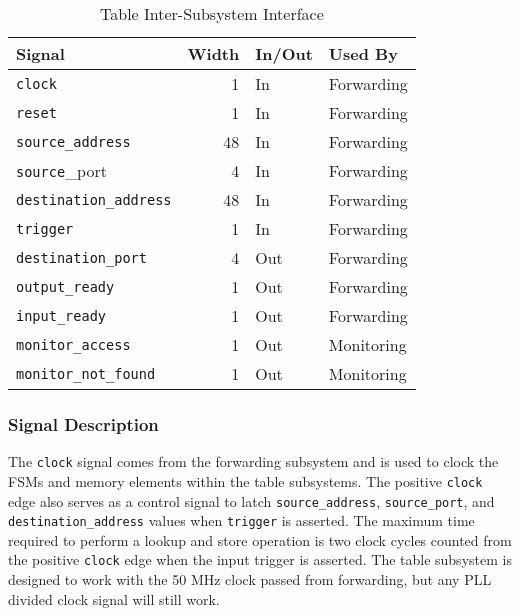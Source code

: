 \documentclass{article}
\begin{document}
\begin{table}[ht]
    \begin{center}
        \begin{tabular}{lrll}\hline
        Signal & Width & In/Out & Used By \\
        \hline
        \texttt{clock} & 1 & In & Forwarding \\
        \hline
        \texttt{reset} & 1 & In & Forwarding \\
        \hline
        \texttt{source\_address} & 48 & In & Forwarding \\
        \hline
        \texttt{source}\_port & 4 & In & Forwarding \\
        \hline
        \texttt{destination\_address} & 48 & In & Forwarding \\
        \hline
        \texttt{trigger} & 1 & In & Forwarding \\
        \hline
        \texttt{destination\_port} & 4 & Out & Forwarding \\
        \hline
        \texttt{output\_ready} & 1 & Out & Forwarding \\
        \hline
        \texttt{input\_ready} & 1 & Out & Forwarding \\
        \hline
        \texttt{monitor\_access} & 1 & Out & Monitoring \\
        \hline
        \texttt{monitor\_not\_found} & 1 & Out & Monitoring \\
        \hline
        \end{tabular}
        \caption{Table Inter-Subsystem Interface}\label{tab:a}
    \end{center}
\end{table}

\subsubsection{Signal Description}

The \texttt{clock} signal comes from the forwarding subsystem and is used to clock the FSMs and memory elements within the table subsystems. The positive \texttt{clock} edge also serves as a control signal to latch \texttt{source\_address}, \texttt{source\_port}, and \texttt{destination\_address} values when \texttt{trigger} is asserted. The maximum time required to perform a lookup and store operation is two clock cycles counted from the positive \texttt{clock} edge when the input trigger is asserted. The table subsystem is designed to work with the 50 MHz clock passed from forwarding, but any PLL divided clock signal will still work. 
\end{document}
